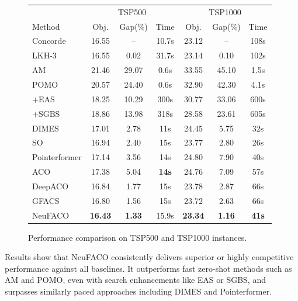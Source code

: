 \documentclass[a4paper,conference]{IEEEtran}
\begin{document}
\begin{figure}[!tb]
\centering
\footnotesize
\setlength{\tabcolsep}{2pt}
\renewcommand{\arraystretch}{1.2}

\begin{minipage}[t]{\linewidth}
\vspace*{0pt}
\centering
\begin{tabular}{l ccc ccc}
\toprule[1pt]
& \multicolumn{3}{c}{TSP500} & \multicolumn{3}{c}{TSP1000}\\
\cmidrule(lr){2-4}\cmidrule(lr){5-7}
Method & Obj. & Gap(\%) & Time & Obj. & Gap(\%) & Time \\
\midrule[1pt]
Concorde           & 16.55 & --    & 10.7s & 23.12 & --   & 108s \\
LKH-3              & 16.55 & 0.02  & 31.7s & 23.14 & 0.10 & 102s \\
\cmidrule(lr){1-1}\cmidrule(lr){2-4}\cmidrule(lr){5-7}
AM                 & 21.46 & 29.07 & 0.6s & 33.55 & 45.10 & 1.5s \\
POMO               & 20.57 & 24.40 & 0.6s & 32.90 & 42.30 & 4.1s \\
\quad +EAS         & 18.25 & 10.29 & 300s & 30.77 & 33.06 & 600s \\
\quad +SGBS        & 18.86 & 13.98 & 318s & 28.58 & 23.61 & 605s \\
DIMES              & 17.01 & 2.78  & 11s  & 24.45 & 5.75  & 32s \\
SO                 & 16.94 & 2.40  & 15s  & 23.77 & 2.80  & 26s \\
Pointerformer      & 17.14 & 3.56  & 14s  & 24.80 & 7.90  & 40s \\
\cmidrule(lr){1-1}\cmidrule(lr){2-4}\cmidrule(lr){5-7}
ACO                & 17.38 & 5.04 & \textbf{14s} & 24.76 & 7.09 & 57s \\
DeepACO            & 16.84 & 1.77 & 15s & 23.78 & 2.87 & 66s \\
GFACS              & 16.80 & 1.56 & 15s & 23.72 & 2.63 & 66s \\
NeuFACO            & \textbf{16.43} & \textbf{1.33} & 15.9s
                   & \textbf{23.34} & \textbf{1.16} & \textbf{41s} \\
\bottomrule[1pt]
\end{tabular}
\end{minipage}

\caption{Performance comparison on TSP500 and TSP1000 instances.}
\label{fig:tsp-results}
\end{figure}


Results show that NeuFACO consistently delivers superior or highly competitive performance against all baselines. It outperforms fast zero-shot methods such as AM and POMO, even with search enhancements like EAS or SGBS, and surpasses similarly paced approaches including DIMES and Pointerformer.
\end{document}

